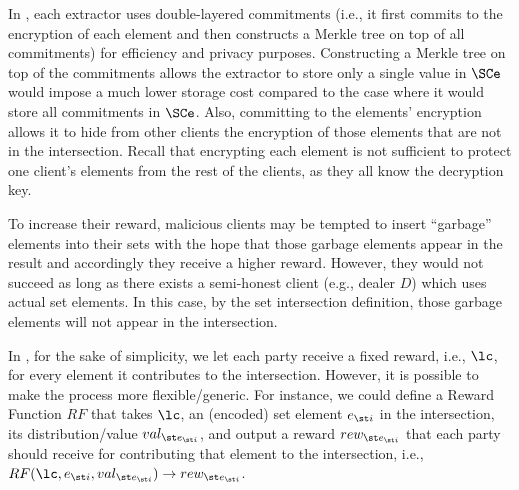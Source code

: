 %







In \epsi, each extractor uses double-layered commitments (i.e., it first commits to the encryption of each element and then constructs a Merkle tree on top of all commitments) for efficiency and privacy purposes. Constructing a Merkle tree on top of the commitments allows the extractor to store only a single value in $\SCe$ would impose a much lower storage cost compared to the case where it would store all commitments in $\SCe$. Also, committing to the elements' encryption allows it to hide from other clients the encryption of those elements that are not in the intersection. Recall that encrypting each element is not sufficient to protect one client's elements from the rest of the clients, as they all know the decryption key. 


To increase their reward, malicious clients may be tempted to insert ``garbage'' elements into their sets with the hope that those garbage elements appear in the result and accordingly they receive a higher reward. However, they would not succeed as long as there exists a semi-honest client (e.g., dealer $D$) which uses actual set elements. In this case, by the set intersection definition, those garbage elements will not appear in the intersection. 


In \epsi, for the sake of simplicity, we let each party receive a fixed reward, i.e., $\lc$, for every element it contributes to the intersection. However, it is possible to make the process more flexible/generic. For instance, we could define a Reward Function $RF$ that takes $\lc$, an (encoded) set element $e_{\st i}$ in the intersection, its distribution/value $val_{\st e_{\st i}}$, and output a reward $rew_{\st e_{\st i}}$ that each party should receive for contributing that element to the intersection, i.e., $RF(\lc, e_{\st i}, val_{\st e_{\st i}})\rightarrow rew_{\st e_{\st i}}$. 